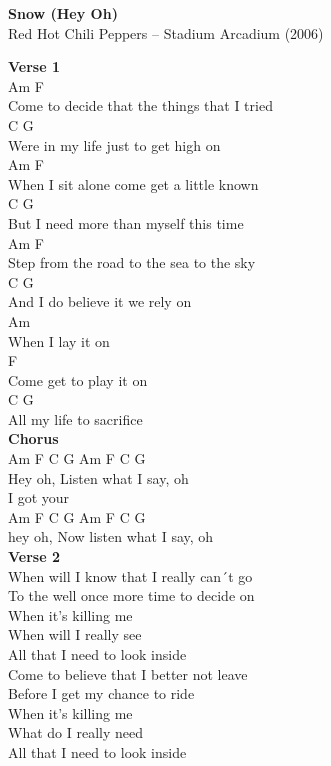 \documentclass[a4paper]{article}
\begin{document}
    \begin{center}
        \textbf{Snow (Hey Oh)}
        ~\\
        Red Hot Chili Peppers -- Stadium Arcadium (2006)
    \end{center}
    {
        \scriptsize
        \textbf{Verse 1}
        ~\\
        {
            \cutive
            \obeyspaces
Am                     F 
\\
Come to decide that the things that I tried
\\
     C                G
\\
Were in my life just to get high on
\\
Am              F
\\
When I sit alone come get a little known
\\
C                     G
\\
But I need more than myself this time
\\
Am                       F
\\
Step from the road to the sea to the sky
\\
      C              G
\\
And I do believe it we rely on
\\
Am
\\
When I lay it on
\\
F
\\
Come get to play it on
\\
C              G
\\
All my life to sacrifice
\\

        }
        \textbf{Chorus}
        ~\\
        {
            \cutive
            \obeyspaces
Am F  C       G   Am  F C G   
\\
Hey oh, Listen what I say, oh
\\
I got your
\\
Am F  C       G         Am  F C G   
\\
hey oh, Now listen what I say, oh
\\

        }
        \textbf{Verse 2}
        ~\\
        {
            \cutive
            \obeyspaces
When will I know that I really can´t go
\\
To the well once more time to decide on
\\
When it's killing me
\\
When will I really see
\\
All that I need to look inside
\\
Come to believe that I better not leave
\\
Before I get my chance to ride
\\
When it's killing me
\\
What do I really need
\\
All that I need to look inside
\\

}}
\end{document}

